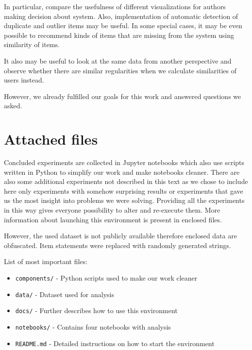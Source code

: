\documentclass[
  print, %
  table,   %
  nolof,     %
  nolot,     %
  nocover,
  color,
  final,
]{fithesis3}
\begin{document}
In particular, compare the usefulness of different visualizations for authors making decision about system. Also, implementation of automatic detection of duplicate and outlier items may be useful. In some special cases, it may be even possible to recommend kinds of items that are missing from the system using similarity of items.

It also may be useful to look at the same data from another perspective and observe whether there are similar regularities when we calculate similarities of users instead.


However, we already fulfilled our goals for this work and answered questions we asked.


\makeatletter\thesis@blocks@clear\makeatother

\appendix %


\chapter{Attached files}

Concluded experiments are collected in Jupyter notebooks which also use scripts written in Python to simplify our work and make notebooks cleaner. There are also some additional experiments not described in this text as we chose to include here only experiments with somehow surprising results or experiments that gave us the most insight into problems we were solving. Providing all the experiments in this way gives everyone possibility to alter and re-execute them. More information about launching this environment is present in enclosed files.

However, the used dataset is not publicly available therefore enclosed data are obfuscated. Item statements were replaced with randomly generated strings.

List of most important files:

\begin{itemize}[\null]
\item \texttt{components/} - Python scripts used to make our work cleaner
\item \texttt{data/} - Dataset used for analysis
\item \texttt{docs/} - Further describes how to use this environment
\item \texttt{notebooks/} - Contains four notebooks with analysis
\item \texttt{README.md} - Detailed instructions on how to start the environment
\end{itemize}
\end{document}
